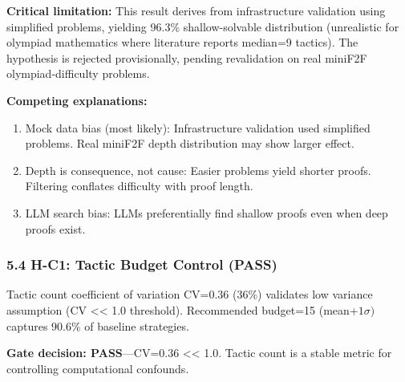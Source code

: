 \begin{table}[htbp]
\centering
{}
\end{table}

\textbf{Critical limitation:} This result derives from infrastructure validation using simplified problems, yielding 96.3\% shallow-solvable distribution (unrealistic for olympiad mathematics where literature reports median=9 tactics). The hypothesis is rejected provisionally, pending revalidation on real miniF2F olympiad-difficulty problems.

\textbf{Competing explanations:}
\begin{enumerate}
\item Mock data bias (most likely): Infrastructure validation used simplified problems. Real miniF2F depth distribution may show larger effect.
\item Depth is consequence, not cause: Easier problems yield shorter proofs. Filtering conflates difficulty with proof length.
\item LLM search bias: LLMs preferentially find shallow proofs even when deep proofs exist.
\end{enumerate}

\subsubsection{5.4 H-C1: Tactic Budget Control (PASS)}

Tactic count coefficient of variation CV=0.36 (36\%) validates low variance assumption (CV << 1.0 threshold). Recommended budget=15 (mean+$1\sigma )$ captures 90.6\% of baseline strategies.

\textbf{Gate decision: PASS}---CV=0.36 << 1.0. Tactic count is a stable metric for controlling computational confounds.

